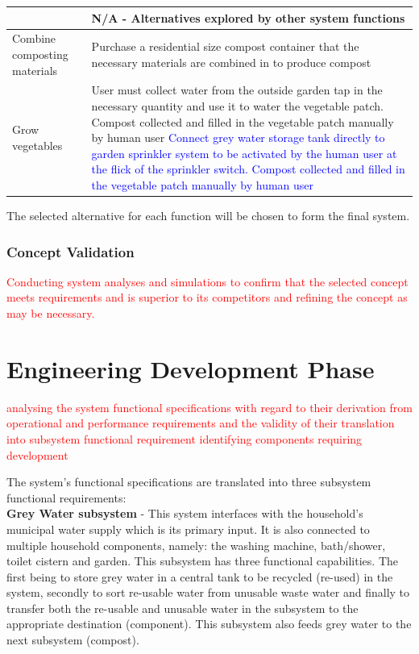 \documentclass[a4paper,11pt,fleqn]{report}
\begin{document}
{\begin{table}[h!]
\begin{center}
\begin{tabular}{p{3.5cm}|p{9cm}}
{    \hline
    Integrate water, recycling and composting & N/A - Alternatives explored by other system functions\\
    \hline
     Combine composting materials & Purchase a residential size compost container that the necessary materials are combined in to produce compost\\
    \hline
     Grow vegetables & User must collect water from the outside garden tap in the necessary quantity and use it to water the vegetable patch. Compost collected and filled in the vegetable patch manually by human user \textcolor{blue}{Connect grey water storage tank directly to garden sprinkler system to be activated by the human user at the flick of the sprinkler switch. Compost collected and filled in the vegetable patch manually by human user}\\
    \hline
    \bottomrule
\end{tabular}
\end{center}
\end{table}
%
The selected alternative for each function will be chosen to form the final system.

\subsection{Concept Validation}
\textcolor{red}{Conducting system analyses and simulations to confirm that the selected concept meets requirements and is superior to its competitors and refining the concept as may be necessary.}

\chapter{Engineering Development Phase}
\textcolor{red}{analysing the system functional specifications with regard to their derivation from operational and performance requirements and the validity of their translation into subsystem functional requirement identifying components requiring development}

The system's functional specifications are translated into three subsystem functional requirements:\\

\textbf{Grey Water subsystem} - This system interfaces with the household's municipal water supply which is its primary input. It is also connected to multiple household components, namely: the washing machine, bath/shower, toilet cistern and garden. This subsystem has three functional capabilities. The first being to store grey water in a central tank to be recycled (re-used) in the system, secondly to sort re-usable water from unusable waste water and finally to transfer both the re-usable and unusable water in the subsystem to the appropriate destination (component). This subsystem also feeds grey water to the next subsystem (compost).\\

}
\end{document}

